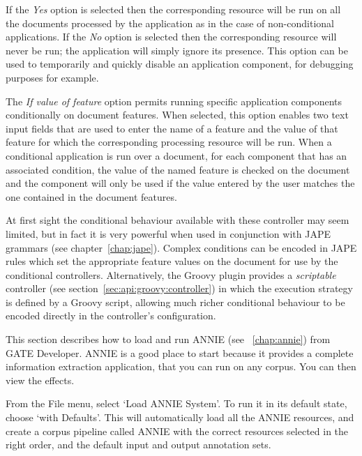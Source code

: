 If the \emph{Yes} option is selected then the corresponding resource will be
run on all the documents processed by the application as in the case of
non-conditional applications. If the \emph{No} option is selected then the
corresponding resource will never be run; the application will simply ignore
its presence. This option can be used to temporarily and quickly disable an
application component, for debugging purposes for example.

The \emph{If value of feature} option permits running specific application
components conditionally on document features. When selected, this option
enables two text input fields that are used to enter the name of a feature and
the value of that feature for which the corresponding processing resource will
be run. When a conditional application is run over a document, for each
component that has an associated condition, the value of the named feature is
checked on the document and the component will only be used if the value
entered by the user matches the one contained in the document features.

At first sight the conditional behaviour available with these controller may
seem limited, but in fact it is very powerful when used in conjunction with
JAPE grammars (see chapter~\ref{chap:jape}).  Complex conditions can be encoded
in JAPE rules which set the appropriate feature values on the document for use
by the conditional controllers.  Alternatively, the Groovy plugin provides a
\emph{scriptable} controller (see section~\ref{sec:api:groovy:controller}) in
which the execution strategy is defined by a Groovy script, allowing much
richer conditional behaviour to be encoded directly in the controller's
configuration.


This section describes how to load and run ANNIE (see
\Chapthing~\ref{chap:annie}) from GATE Developer. ANNIE is a good place to
start because it provides a complete information extraction application, that
you can run on any corpus. You can then view the effects.

From the File menu, select `Load ANNIE System'. To run it in its
default state, choose `with Defaults'. This will automatically load
all the ANNIE resources, and create a corpus pipeline called ANNIE with the
correct resources selected in the right order, and the default input and
output annotation sets.

